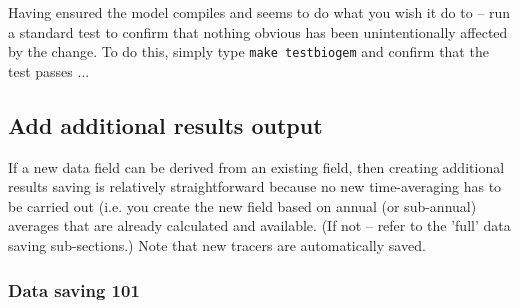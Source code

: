 \documentclass[11pt,fleqn]{book} %
\begin{document}
\noindent Having ensured the model compiles and seems to do what you wish it do to -- run a standard test to confirm that nothing obvious has been unintentionally affected by the change. To do this, simply type \texttt{make testbiogem} and confirm that the test passes ...

%
\subsection*{Add additional results output}\label{Add new output}

If a new data field can be derived from an existing field, then creating additional results saving is relatively straightforward because no new time-averaging has to be carried out (i.e. you create the new field based on annual (or sub-annual) averages that are already calculated and available. (If not -- refer to the 'full' data saving sub-sections.) Note that new tracers are automatically saved.

%
\subsubsection{Data saving 101}
\end{document}
